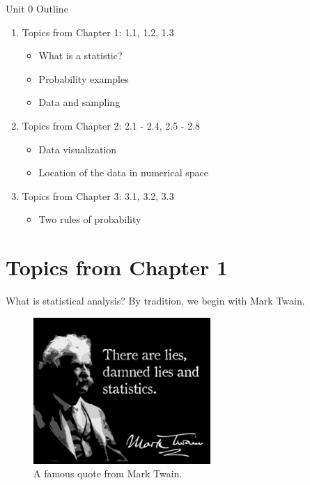 \documentclass{beamer}
\begin{document}
\begin{frame}{Unit 0 Outline}
\begin{enumerate}
\item Topics from Chapter 1: 1.1, 1.2, 1.3
\begin{itemize}
\item What is a statistic?
\item Probability examples
\item Data and sampling
\end{itemize}
\item Topics from Chapter 2: 2.1 - 2.4, 2.5 - 2.8
\begin{itemize}
\item Data visualization
\item Location of the data in numerical space
\end{itemize}
\item Topics from Chapter 3: 3.1, 3.2, 3.3
\begin{itemize}
\item Two rules of probability
\end{itemize}
\end{enumerate}
\end{frame}

\section{Topics from Chapter 1}

\begin{frame}{What is statistical analysis?}
By tradition, we begin with Mark Twain.
\begin{figure}
\centering
\includegraphics[width=0.6\textwidth]{figures/twain.png}
\caption{A famous quote from Mark Twain.}
\end{figure}
\end{frame}
\end{document}
